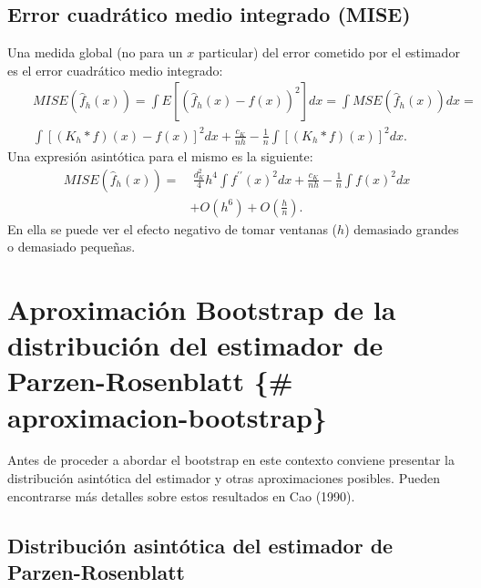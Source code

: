 \documentclass[
]{book}
\theoremstyle{definition}
\theoremstyle{definition}
\theoremstyle{definition}
\theoremstyle{remark}
\begin{document}
\hypertarget{error-cuadruxe1tico-medio-integrado-mise}{%
\subsection{Error cuadrático medio integrado (MISE)}\label{error-cuadruxe1tico-medio-integrado-mise}}

Una medida global (no para un \(x\) particular) del error cometido por el
estimador es el error cuadrático medio integrado:
\[\begin{aligned}
& & MISE\left( \hat{f}_{h}\left( x \right) \right) =\int E\left[ \left( \hat{f}
_{h}\left( x \right) -f\left( x \right) \right)^2\right] dx=\int MSE\left( 
\hat{f}_{h}\left( x \right) \right) dx= \\
&&\int \left[ \left( K_{h}\ast f \right) \left( x \right) -f\left( x \right) 
\right]^2dx+\frac{c_{K}}{nh}-\frac{1}{n}\int \left[ \left( K_{h}\ast
f \right) \left( x \right) \right]^2dx.
\end{aligned}\]
Una expresión asintótica para el mismo es la siguiente:
\[\begin{aligned}
MISE\left( \hat{f}_{h}\left( x \right) \right) =&\ \frac{d_{K}^2}{4}h^4\int
f^{\prime \prime }\left( x \right)^2dx+\frac{c_{K}}{nh}-\frac{1}{n}\int
f\left( x \right)^2dx \\
&+O\left( h^{6} \right) +O \left( \frac{h}{n} \right).
\end{aligned}\]
En ella se puede ver el efecto negativo de tomar ventanas (\(h\)) demasiado
grandes o demasiado pequeñas.

\hypertarget{aproximaciuxf3n-bootstrap-de-la-distribuciuxf3n-del-estimador-de-parzen-rosenblatt-aproximacion-bootstrap}{%
\section{Aproximación Bootstrap de la distribución del estimador de Parzen-Rosenblatt \{\# aproximacion-bootstrap\}}\label{aproximaciuxf3n-bootstrap-de-la-distribuciuxf3n-del-estimador-de-parzen-rosenblatt-aproximacion-bootstrap}}

Antes de proceder a abordar el bootstrap en este contexto conviene
presentar la distribución asintótica del estimador y otras
aproximaciones posibles. Pueden encontrarse más detalles sobre estos
resultados en Cao (1990).

\hypertarget{distribuciuxf3n-asintuxf3tica-del-estimador-de-parzen-rosenblatt}{%
\subsection{Distribución asintótica del estimador de Parzen-Rosenblatt}\label{distribuciuxf3n-asintuxf3tica-del-estimador-de-parzen-rosenblatt}}
\end{document}
